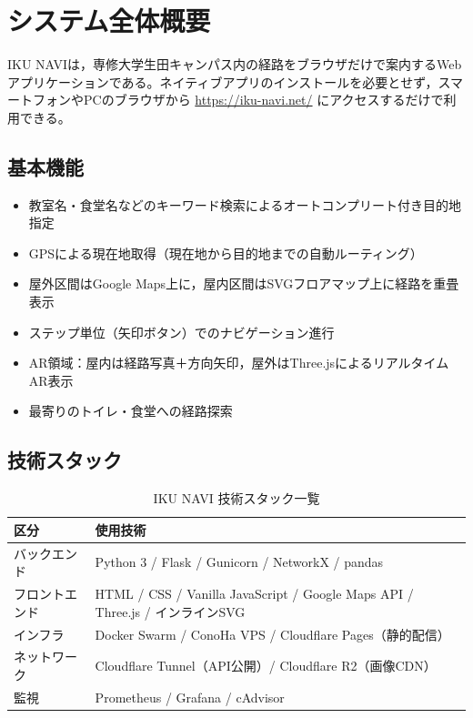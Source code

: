\documentclass[a4paper,10.5pt]{ltjsarticle}
\begin{document}
\section{システム全体概要}
\label{sec:overview}

IKU NAVIは，専修大学生田キャンパス内の経路をブラウザだけで案内するWebアプリケーションである。ネイティブアプリのインストールを必要とせず，スマートフォンやPCのブラウザから \url{https://iku-navi.net/} にアクセスするだけで利用できる。

\subsection{基本機能}

\begin{itemize}[itemsep=1pt]
  \item 教室名・食堂名などのキーワード検索によるオートコンプリート付き目的地指定
  \item GPSによる現在地取得（現在地から目的地までの自動ルーティング）
  \item 屋外区間はGoogle Maps上に，屋内区間はSVGフロアマップ上に経路を重畳表示
  \item ステップ単位（矢印ボタン）でのナビゲーション進行
  \item AR領域：屋内は経路写真＋方向矢印，屋外はThree.jsによるリアルタイムAR表示
  \item 最寄りのトイレ・食堂への経路探索
\end{itemize}

\subsection{技術スタック}

\begin{table}[h]
\centering
\caption{IKU NAVI 技術スタック一覧}
\begin{tabular}{ll}
\toprule
区分 & 使用技術 \\
\midrule
バックエンド & Python 3 / Flask / Gunicorn / NetworkX / pandas \\
フロントエンド & HTML / CSS / Vanilla JavaScript / Google Maps API / Three.js / インラインSVG \\
インフラ & Docker Swarm / ConoHa VPS / Cloudflare Pages（静的配信） \\
ネットワーク & Cloudflare Tunnel（API公開）/ Cloudflare R2（画像CDN） \\
監視 & Prometheus / Grafana / cAdvisor \\
\bottomrule
\end{tabular}
\end{table}
\end{document}
